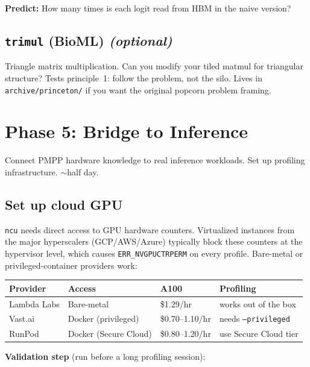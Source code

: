 \documentclass[11pt, letterpaper]{article}
\begin{document}
\textbf{Predict:} How many times is each logit read from HBM in the naive version?

\subsection{\texttt{trimul} (BioML) \emph{(optional)}}

Triangle matrix multiplication. Can you modify your tiled matmul for triangular structure? Tests principle~1: follow the problem, not the silo. Lives in \texttt{archive/princeton/} if you want the original popcorn problem framing.

\section{Phase 5: Bridge to Inference}

\begin{phasebox}[Goal]
Connect PMPP hardware knowledge to real inference workloads. Set up profiling infrastructure. $\sim$half day.
\end{phasebox}

\subsection{Set up cloud GPU}

\texttt{ncu} needs direct access to GPU hardware counters. Virtualized instances from the major hyperscalers (GCP/AWS/Azure) typically block these counters at the hypervisor level, which causes \texttt{ERR\_NVGPUCTRPERM} on every profile. Bare-metal or privileged-container providers work:

\smallskip
\begin{tabularx}{\textwidth}{@{}lXll@{}}
\toprule
\textbf{Provider} & \textbf{Access} & \textbf{A100} & \textbf{Profiling} \\
\midrule
Lambda Labs & Bare-metal & \$1.29/hr & works out of the box \\
Vast.ai & Docker (privileged) & \$0.70--1.10/hr & needs \texttt{--privileged} \\
RunPod & Docker (Secure Cloud) & \$0.80--1.20/hr & use Secure Cloud tier \\
\bottomrule
\end{tabularx}

\medskip
\textbf{Validation step} (run before a long profiling session):
\end{document}
